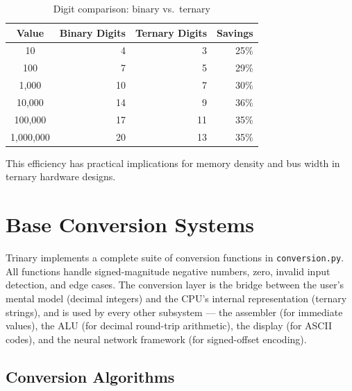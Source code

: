 \documentclass[10pt,a4paper,twoside]{book}
\begin{document}
\begin{table}[H]
\centering
\caption{Digit comparison: binary vs.\ ternary}
\label{tab:digits}
\begin{tabular}{crrr}
\toprule
Value & Binary Digits & Ternary Digits & Savings \\
\midrule
10     & 4  & 3  & 25\% \\
100    & 7  & 5  & 29\% \\
1,000  & 10 & 7  & 30\% \\
10,000 & 14 & 9  & 36\% \\
100,000 & 17 & 11 & 35\% \\
1,000,000 & 20 & 13 & 35\% \\
\bottomrule
\end{tabular}
\end{table}

This efficiency has practical implications for memory density and bus width in ternary
hardware designs.

\chapter{Base Conversion Systems}
\label{ch:conversion}

Trinary implements a complete suite of conversion functions in \texttt{conversion.py}.
All functions handle signed-magnitude negative numbers, zero, invalid input detection,
and edge cases. The conversion layer is the bridge between the user's mental model
(decimal integers) and the CPU's internal representation (ternary strings), and is
used by every other subsystem — the assembler (for immediate values), the ALU (for
decimal round-trip arithmetic), the display (for ASCII codes), and the neural network
framework (for signed-offset encoding).

\section{Conversion Algorithms}
\end{document}
